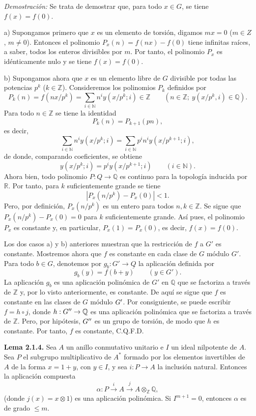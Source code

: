 \emph{Demostración:} Se trata de demostrar que, para todo $x\in G$, se tiene
$f(x)=f(0)$.

a) Supongamos primero que $x$ es un elemento de torsión, digamos $mx=0$
($m\in Z$, $m\ne0$). Entonces el polinomio
$P_x(n)=f(nx)-f(0)$ tiene infinitas raíces, a saber, todos los enteros
divisibles por $m$. Por tanto, el polinomio $P_x$ es idénticamente nulo y se
tiene $f(x)=f(0)$.

b) Supongamos ahora que $x$ es un elemento libre de $G$ divisible por todas
las potencias $p^k$ ($k\in\mathbb Z$). Consideremos los polinomios $P_k$
definidos por
\[
P_k(n)=f(nx/p^k)=\sum_{i\in\mathbb N}n^iy(x/p^k;i)\in\mathbb Z
\qquad(n\in\mathbb Z;\ y(x/p^k,i)\in\mathbb Q).
\]
Para todo $n\in\mathbb Z$ se tiene la identidad
\[
P_k(n)=P_{k+1}(pn),
\]
es decir,
\[
\sum_{i\in\mathbb N}n^iy(x/p^k;i)=
\sum_{i\in\mathbb N}p^in^iy(x/p^{k+1};i),
\]
de donde, comparando coeficientes, se obtiene
\[
y(x/p^k;i)=p^iy(x/p^{k+1};i)\qquad(i\in\mathbb N).
\]
Ahora bien, todo polinomio $P:Q\to\mathbb Q$ es continuo para la
topología inducida por $\mathbb R$. Por tanto, para $k$ suficientemente
grande se tiene
\[
|P_x(n/p^k)-P_x(0)|<1.
\]
Pero, por definición, $P_x(n/p^k)$ es un entero para todos
$n,k\in\mathbb Z$. Se sigue que $P_x(n/p^k)-P_x(0)=0$ para $k$
suficientemente grande. Así pues, el polinomio $P_x$ es constante y, en
particular, $P_x(1)=P_x(0)$, es decir, $f(x)=f(0)$.

Los dos casos a) y b) anteriores muestran que la restricción de $f$ a $G'$
es constante. Mostremos ahora que $f$ es constante en cada clase de $G$
módulo $G'$. Para todo $b\in G$, denotemos por
$g_b:G'\to\underline Q$ la aplicación definida por
\[
g_b(y)=f(b+y)\qquad(y\in G').
\]
La aplicación $g_b$ es una aplicación polinómica de $G'$ en $\mathbb Q$ que
se factoriza a través de $\mathbb Z$ y, por lo visto anteriormente, es
constante. De aquí se sigue que $f$ es constante en las clases de $G$ módulo
$\sisi{G''}{G'}$. Por consiguiente, se puede escribir $f=h\circ j$, donde
$\sisi{h:G'\to\mathbb Q}{h:G''\to\mathbb Q}$ es una aplicación polinómica que se factoriza a través
de $\mathbb Z$. Pero, por hipótesis, $\sisi{C''}{G''}$ es un grupo de
torsión, de modo que $h$ es constante. Por tanto, $f$ es constante,
C.Q.F.D.

\textbf{Lema 2.1.4.} Sea $A$ un anillo conmutativo unitario e $I$ un ideal
nilpotente de $A$. Sea $P$ el subgrupo multiplicativo de $A^*$ formado por
los elementos invertibles de $A$ de la forma $x=1+y$, con $y\in I$, y sea
$i:P\to A$ la inclusión natural. Entonces la aplicación compuesta
\[
\alpha:P\xrightarrow{i}A\xrightarrow{j}A\otimes_{\mathbb Z}\mathbb Q,
\]
(donde $j(x)=x\otimes1$) es una aplicación polinómica. Si $I^{m+1}=0$,
entonces $\alpha$ es de grado $\leq m$.

